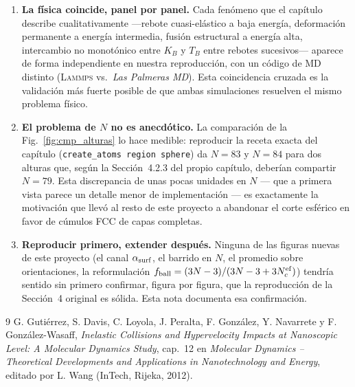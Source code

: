 \documentclass[11pt,a4paper]{article}
\newcommand{\lammps}{\textsc{Lammps}}
\begin{document}
\begin{enumerate}[leftmargin=1.4em]

\item \textbf{La física coincide, panel por panel.} Cada fenómeno que el
capítulo describe cualitativamente ---rebote cuasi-elástico a baja
energía, deformación permanente a energía intermedia, fusión estructural
a energía alta, intercambio no monotónico entre $K_B$ y $T_B$ entre
rebotes sucesivos--- aparece de forma independiente en nuestra
reproducción, con un código de MD distinto (\lammps{} vs.\ \emph{Las
Palmeras MD}). Esta coincidencia cruzada es la validación más fuerte
posible de que ambas simulaciones resuelven el mismo problema físico.

\item \textbf{El problema de $N$ no es anecdótico.} La comparación de la
Fig.~\ref{fig:cmp_alturas} lo hace medible: reproducir la receta exacta
del capítulo (\texttt{create\_atoms region sphere}) da $N=83$ y $N=84$
para dos alturas que, según la Sección~4.2.3 del propio capítulo, deberían
compartir $N=79$. Esta discrepancia de unas pocas unidades en $N$ --- que
a primera vista parece un detalle menor de implementación --- es
exactamente la motivación que llevó al resto de este proyecto a abandonar
el corte esférico en favor de cúmulos FCC de capas completas.

\item \textbf{Reproducir primero, extender después.} Ninguna de las
figuras nuevas de este proyecto (el canal $\alpha_{\rm surf}$, el barrido
en $N$, el promedio sobre orientaciones, la reformulación
$f_{\rm ball}=(3N-3)/(3N-3+3N_c^{\rm ef})$) tendría sentido sin primero
confirmar, figura por figura, que la reproducción de la Sección~4 original
es sólida. Esta nota documenta esa confirmación.

\end{enumerate}

\begin{thebibliography}{9}
G. Gutiérrez, S. Davis, C. Loyola, J. Peralta, F. González, Y. Navarrete
y F. González-Wasaff, \textit{Inelastic Collisions and Hypervelocity
Impacts at Nanoscopic Level: A Molecular Dynamics Study}, cap.~12 en
\textit{Molecular Dynamics -- Theoretical Developments and Applications
in Nanotechnology and Energy}, editado por L. Wang (InTech, Rijeka, 2012).
\end{thebibliography}
\end{document}
